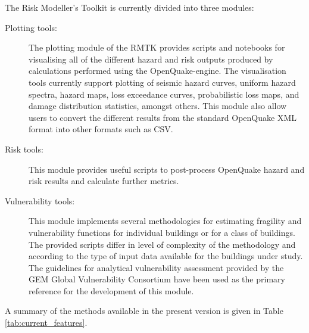 The Risk Modeller's Toolkit is currently divided into three modules:
\begin{description}
\item[Plotting tools:] The plotting module of the RMTK provides scripts and notebooks for visualising all of the different hazard and risk outputs produced by calculations performed using the OpenQuake-engine. The visualisation tools currently support plotting of seismic hazard curves, uniform hazard spectra, hazard maps, loss exceedance curves, probabilistic loss maps, and damage distribution statistics, amongst others. This module also allow users to convert the different results from the standard OpenQuake XML format into other formats such as CSV.
\item[Risk tools:] This module provides useful scripts to post-process OpenQuake hazard and risk results and calculate further metrics.
\item[Vulnerability tools:] This module implements several methodologies for estimating fragility and vulnerability functions for individual buildings or for a class of buildings. The provided scripts differ in level of complexity of the methodology and according to the type of input data available for the buildings under study. The guidelines for analytical vulnerability assessment provided by the GEM Global Vulnerability Consortium have been used as the primary reference for the development of this module.
\end{description}

A summary of the methods available in the present version is given in Table \ref{tab:current_features}.

